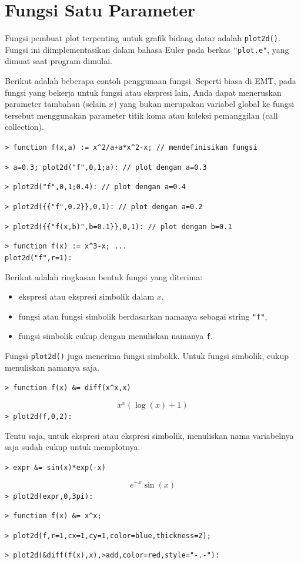 \documentclass[11pt, a4paper]{article}
\newcommand{\emtcmd}[1]{\noindent\texttt{\textcolor{emtcommand}{>}\ #1}\par\smallskip}
\begin{document}
\section*{Fungsi Satu Parameter}

Fungsi pembuat plot terpenting untuk grafik bidang datar adalah \texttt{plot2d()}. Fungsi ini diimplementasikan dalam bahasa Euler pada berkas \texttt{"plot.e"}, yang dimuat saat program dimulai.

Berikut adalah beberapa contoh penggunaan fungsi. Seperti biasa di EMT, pada fungsi yang bekerja untuk fungsi atau ekspresi lain, Anda dapat meneruskan parameter tambahan (selain $x$) yang bukan merupakan variabel global ke fungsi tersebut menggunakan parameter titik koma atau koleksi pemanggilan (call collection).

\emtcmd{function f(x,a) := x\^{}2/a+a*x\^{}2-x; \textcolor{emtcomment}{// mendefinisikan fungsi}}
\emtcmd{a=0.3; plot2d("f",0,1;a): \textcolor{emtcomment}{// plot dengan a=0.3}}
\emtcmd{plot2d("f",0,1;0.4): \textcolor{emtcomment}{// plot dengan a=0.4}}
\emtcmd{plot2d(\{\{"f",0.2\}\},0,1): \textcolor{emtcomment}{// plot dengan a=0.2}}
\emtcmd{plot2d(\{\{"f(x,b)",b=0.1\}\},0,1): \textcolor{emtcomment}{// plot dengan b=0.1}}
\emtcmd{function f(x) := x\^{}3-x; ... \\
\hspace*{1em} plot2d("f",r=1):}

Berikut adalah ringkasan bentuk fungsi yang diterima:
\begin{itemize}
    \item ekspresi atau ekspresi simbolik dalam $x$,
    \item fungsi atau fungsi simbolik berdasarkan namanya sebagai string \texttt{"f"},
    \item fungsi simbolik cukup dengan menuliskan namanya \texttt{f}.
\end{itemize}

Fungsi \texttt{plot2d()} juga menerima fungsi simbolik. Untuk fungsi simbolik, cukup menuliskan namanya saja.

\emtcmd{function f(x) \&= diff(x\^{}x,x)}
$$x^x (\log(x) + 1)$$
\emtcmd{plot2d(f,0,2):}

Tentu saja, untuk ekspresi atau ekspresi simbolik, menuliskan nama variabelnya saja sudah cukup untuk memplotnya.

\emtcmd{expr \&= sin(x)*exp(-x)}
$$e^{-x} \sin(x)$$
\emtcmd{plot2d(expr,0,3pi):}
\emtcmd{function f(x) \&= x\^{}x;}
\emtcmd{plot2d(f,r=1,cx=1,cy=1,color=blue,thickness=2);}
\emtcmd{plot2d(\&diff(f(x),x),>add,color=red,style="-.-"):}
\end{document}
